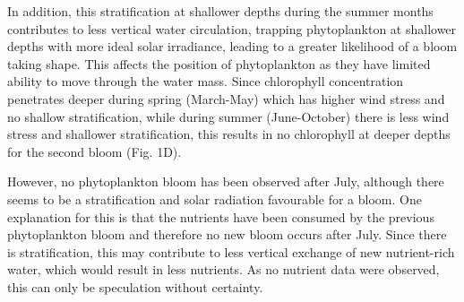 \documentclass[../Main.tex]{subfiles}
\begin{document}
In addition, this stratification at shallower depths during the summer months contributes to less vertical water circulation, trapping phytoplankton at shallower depths with more ideal solar irradiance, leading to a greater likelihood of a bloom taking shape. This affects the position of phytoplankton as they have limited ability to move through the water mass\supercite{kase2018phytoplankton}.
Since chlorophyll concentration penetrates deeper during spring (March-May) which has higher wind stress and no shallow stratification, while during summer (June-October) there is less wind stress and shallower stratification, this results in no chlorophyll at deeper depths for the second bloom (Fig. 1D).

However, no phytoplankton bloom has been observed after July, although there seems to be a stratification and solar radiation favourable for a bloom. One explanation for this is that the nutrients have been consumed by the previous phytoplankton bloom and therefore no new bloom occurs after July. Since there is stratification, this may contribute to less vertical exchange of new nutrient-rich water, which would result in less nutrients. As no nutrient data were observed, this can only be speculation without certainty. 






 
\end{document}

